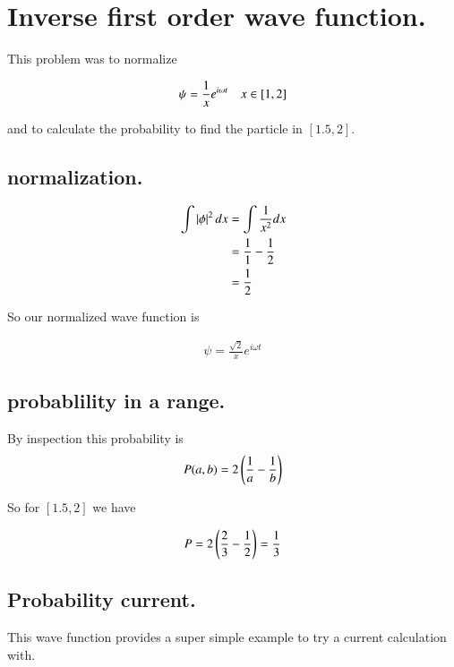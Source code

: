 \documentclass{article}
\begin{document}

\section{ Inverse first order wave function. }

This problem was to normalize 

\begin{align*}
\psi = \frac{1}{x}e^{i\omega t}\quad x \in [1,2]
\end{align*}

and to calculate the probability to find the particle in $[1.5,2]$.

\subsection{ normalization. }

\begin{align*}
\int \left\lvert{\phi}\right\rvert^2 dx 
&= \int \frac{1}{x^2} dx \\
&= \frac{1}{1} -\frac{1}{2} \\
&= \frac{1}{2}
\end{align*}

So our normalized wave function is

\begin{align*}
\psi = \frac{\sqrt{2}}{x}e^{i\omega t}
\end{align*}

\subsection{ probablility in a range. }

By inspection this probability is
\begin{align*}
P(a,b) = {2}\left(\frac{1}{a} - \frac{1}{b}\right)
\end{align*}

So for $[1.5,2]$ we have

\begin{align*}
P = {2}\left(\frac{2}{3} - \inv{2}\right) = \inv{3} %
\end{align*}

\subsection{ Probability current. }

This wave function provides a super simple example to try a current
calculation with.
\end{document}
